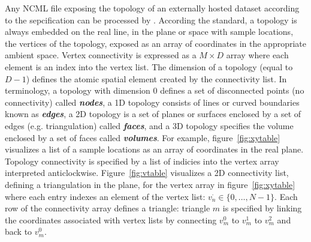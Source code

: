 Any NCML file exposing the topology of an externally hosted
dataset according to the \cfugrid{} sepcification can be processed by
\sciwms{}. According the \cfugrid{} standard, a topology is always
embedded on the real line, in the plane or space with sample
locations, the vertices of the topology, exposed as an array of
coordinates in the appropriate ambient space. Vertex connectivity is
expressed as a $M \times D$ array where each element is an index into
the vertex list. The dimension of a topology (equal to $D - 1$) defines the
atomic spatial element created by the connectivity list. In \cfugrid{}
terminology, a topology with dimension 0 defines a set of disconnected
points (no connectivity) called \textbf{\textit{nodes}}, a 1D topology
consists of lines or curved boundaries known as
\textbf{\textit{edges}}, a 2D topology is a set of planes or surfaces
enclosed by a set of edges (e.g. triangulation) called
\textbf{\textit{faces}}, and a 3D topology specifies the volume enclosed
by a set of faces called \textbf{\textit{volumes}}.
For example, figure~\ref{fig:xytable} visualizes a list of a sample
locations as an array of coordinates in the real plane. Topology
connectivity is specified by a list of indicies into the vertex array
interpreted anticlockwise. Figure~\ref{fig:vtable} visualizes a 2D
connectivity list, defining a triangulation in the plane, for the
vertex array in figure~\ref{fig:xytable} where each entry indexes an
element of the vertex list: $v_n^{\cdot}\in \{0,\ldots,N-1\}$. Each
row of the connectivity array defines a triangle: triangle $m$ is
specified by linking the coordinates associated with vertex lists by
connecting $v^0_m$ to $v^1_m$ to $v^2_m$ and back to $v^0_m$.
